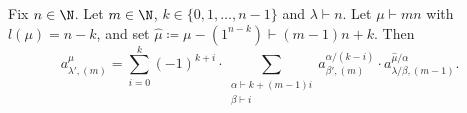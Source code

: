 \begin{theorem}[Theorem A]\label{thm:14.6i}
	Fix $n\in\N$. Let $m\in\N$, $k\in\{0,1,\dotsc,n-1\}$ and $\lambda\vdash n$. Let $\mu\vdash mn$ with $l(\mu)=n-k$, and set $\hat{\mu}\coloneqq \mu-(1^{n-k})\vdash (m-1)n+k$. Then
	\begin{equation}\label{eqn:A}
		a^\mu_{\lambda',(m)} = \sum_{i=0}^k (-1)^{k+i} \cdot \sum_{\substack{\alpha\vdash k+(m-1)i\\\beta\vdash i}} a^{\alpha/(k-i)}_{\beta',(m)}\cdot a^{\hat{\mu}/\alpha}_{\lambda/\beta,(m-1)}.
	\end{equation}
\end{theorem}
